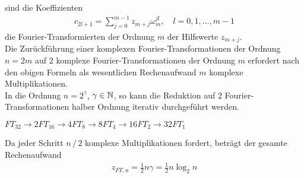 sind die Koeffizienten
\begin{align*}
  c_{2l+1} = \sum_{j=0}^{m-1} z_{m+j} \omega_m^{jl}, \quad l=0,1,\dots,m-1
\end{align*}
die Fourier-Transformierten der Ordnung $m$ der Hilfswerte $z_{m+j}$. \\
Die Zurückführung einer komplexen Fourier-Transformationen der Ordnung $n=2m$ auf $2$ komplexe Fourier-Transformationen 
der Ordnung $m$ erfordert nach den obigen Formeln als wesentlichen Rechenaufwand $m$ komplexe Multiplikationen. \\
In die Ordnung $n=2^\gamma$, $\gamma\in\mathbb N$, so kann die Reduktion auf $2$ Fourier-Transformationen halber Ordnung
iterativ durchgeführt werden. \\
\begin{egbox}
  $FT_{32} \to 2FT_{16}\to 4FT_8 \to 8FT_4 \to 16FT_2\to 32FT_1$
\end{egbox}
Da jeder Schritt $n\,/\,2$ komplexe Multiplikationen fordert, beträgt der gesamte Rechenaufwand
\begin{align*}
  z_{FT,n} = \tfrac{1}{2}n\gamma = \tfrac{1}{2}n\log_2 n
\end{align*}
